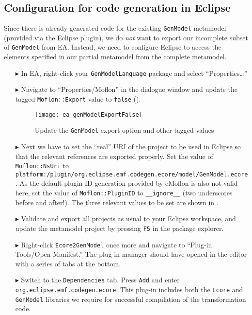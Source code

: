 \newpage

\subsection{Configuration for code generation in Eclipse}
\genHeader

Since there is already generated code for the existing \texttt{GenModel} metamodel (provided via the Eclipse plugin), we do \emph{not} want to export our
incomplete subset of \texttt{GenModel} from EA. Instead, we need to configure Eclipse to access the elements specified in our partial metamodel from the
complete metamodel.

\begin{enumerate}

\item[$\blacktriangleright$] In EA, right-click your \texttt{GenModelLanguage} package and select ``Properties\ldots'' 

\item[$\blacktriangleright$] Navigate to ``Properties/Moflon'' in the dialogue window and update the tagged \texttt{Moflon::Export} value to \texttt{false}
().

\begin{figure}[htb]
\begin{center}  \texttt{[image: ea\_genModelExportFalse]}
  \caption{Update the \texttt{GenModel} export option and other tagged values}  
  \label{fig_customNS}
\end{center}
\end{figure}

\item[$\blacktriangleright$] Next we have to set the ``real'' URI of the project to be used in Eclipse so that the relevant references are exported
properly. Set the value of \texttt{Moflon::NsUri} to \texttt{platform:/\-plugin/\-org.\-eclipse.\-emf.codegen.ecore/\-model/\-GenModel.ecore}.
As the default plugin ID generation provided by eMoflon is also not valid here, set the value of \texttt{Moflon::PluginID} to \texttt{\_\_ignore\_\_} (two underscores before and after!).
The three relevant values to be set are shown in .

\item[$\blacktriangleright$] Validate and export all projects as usual to your Eclipse workspace, and update the metamodel project by pressing \texttt{F5} in
the package explorer.

\item[$\blacktriangleright$] Right-click \texttt{Ecore2GenModel} once more and navigate to ``Plug-in Tools/Open Manifest.'' The plug-in manager should have
opened in the editor with a series of tabs at the bottom.

\item[$\blacktriangleright$] Switch to the \texttt{Dependencies} tab. Press \texttt{Add} and enter \texttt{org.\-eclipse.\-emf.\-codegen.\-ecore}. This plug-in
includes both the \texttt{Ecore} and \texttt{Gen\-Mod\-el} libraries we require for successful compilation of the transformation code.

\end{enumerate}

